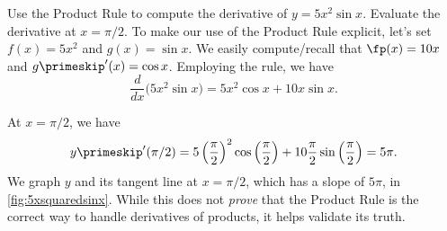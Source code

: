 \begin{example}\label{ex_prod1}
Use the Product Rule to compute the derivative of $y=5x^2\sin x$. Evaluate the derivative at $x=\pi/2$.
\solution
To make our use of the Product Rule explicit, let's set $f(x) = 5x^2$ and $g(x) = \sin x$. We easily compute/recall that $\fp(x) = 10x$ and $g\primeskip'(x) = \cos x$. Employing the rule, we have
\[\frac{d}{dx}\Big(5x^2\sin x\Big) = 5x^2\cos x + 10x\sin x.\]


At $x=\pi/2$, we have
\[y\primeskip'(\pi/2) = 5\left(\frac{\pi}{2}\right)^2\cos \left(\frac{\pi}2\right) + 10\frac{\pi}2 \sin\left(\frac{\pi}{2}\right) = 5\pi.\]
We graph $y$ and its tangent line at $x=\pi/2$, which has a slope of $5\pi$, in \autoref{fig:5xsquaredsinx}. While this does not \textit{prove} that the Product Rule is the correct way to handle derivatives of products, it helps validate its truth.
\end{example}

